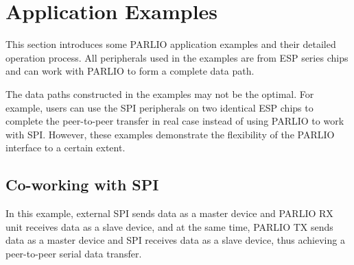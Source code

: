 \documentclass[main\_\_EN.tex]{subfiles}
\begin{document}
\section{Application Examples}
\label{sec:parlio-application-example}

This section introduces some PARLIO application examples and their detailed operation process. All peripherals used in the examples are from ESP series chips and can work with PARLIO to form a complete data path.

\begin{tiplisting}
The data paths constructed in the examples may not be the optimal. For example, users can use the SPI peripherals on two identical ESP chips to complete the peer-to-peer transfer in real case instead of using PARLIO to work with SPI. However, these examples demonstrate the flexibility of the PARLIO interface to a certain extent.
\end{tiplisting}

\subsection{Co-working with SPI}

In this example, external SPI sends data as a master device and PARLIO RX unit receives data as a slave device, and at the same time, PARLIO TX sends data as a master device and SPI receives data as a slave device, thus achieving a peer-to-peer serial data transfer.
\end{document}
